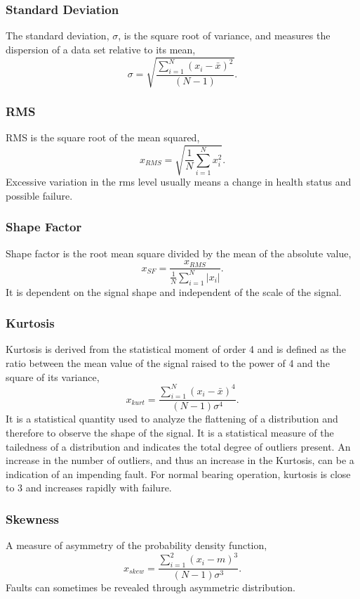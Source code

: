 \documentclass[]{article}
\begin{document}
\subsubsection*{Standard Deviation}  
The standard deviation, $\sigma$, is the square root of variance, and measures the dispersion of a data set relative to its mean,
\begin{equation}
	\sigma = \sqrt{\frac{\sum^N_{i=1}(x_i-\bar{x})^2}{(N-1)}}.
\end{equation}
\subsubsection*{\gls{RMS}}
\gls{RMS} is the square root of the mean squared,
\begin{equation}
x_{RMS} = \sqrt{\frac{1}{N} \sum^N_{i=1}x^2_i}.
\end{equation}
Excessive variation in the rms level usually means a change in health status and possible failure. 
\subsubsection*{Shape Factor}
Shape factor is the root mean square divided by the mean of the absolute value,
\begin{equation}
x_{SF} = \frac{ x_{RMS} }  {\frac{1}{N}\sum^N_{i=1}|x_i|}.
\end{equation}
It is dependent on the signal shape and independent of the scale of the signal.
\subsubsection*{Kurtosis}
Kurtosis is derived from the statistical moment of order 4 and is defined as the ratio between the mean value of the signal raised to the power of 4 and the square of its variance, \begin{equation}
x_{kurt} = \frac{\sum^N_{i=1}(x_i-\bar{x})^4}{(N-1)\sigma^4}.
\end{equation}
It is a statistical quantity used to analyze the flattening of a distribution and therefore to observe the shape of the signal. It is a statistical measure of the tailedness of a distribution and indicates the total degree of outliers present. An increase in the number of outliers, and thus an increase in the Kurtosis, can be a indication of an impending fault. For normal bearing operation, kurtosis is close to 3 and increases rapidly with failure.
\subsubsection*{Skewness} 
A measure of asymmetry of the probability density function,
\begin{equation}
x_{skew} = \frac{\sum^2_{i=1}(x_i-m)^3}{(N-1)\sigma^3}.
\end{equation}
Faults can sometimes be revealed through asymmetric distribution.
\end{document}
